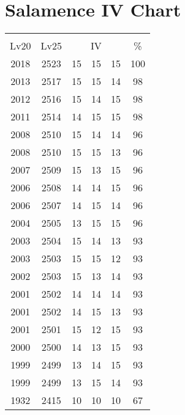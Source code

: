 \documentclass{article}%
\begin{document}
%
\normalsize%
\section{Salamence IV Chart}%
\label{sec:Salamence IV Chart}%
\renewcommand{\arraystretch}{1.5}%
\begin{tabular}{|c|c|c|c|c|c|}%
\hline%
\multicolumn{6}{|c|}{\textcolor{white}{ 
\linebreak{Salamence}
}%
\cellcolor{black}}\\%
\multicolumn{1}{|c}{Lv20}&\multicolumn{1}{c|}{Lv25}&\multicolumn{3}{c|}{IV}&\multicolumn{1}{|c|}{\%}\\%
\hline%
\rowcolor{color100}%
2018&2523&15&15&15&100\\%
\hline%
\rowcolor{color98}%
2013&2517&15&15&14&98\\%
\hline%
\rowcolor{color98}%
2012&2516&15&14&15&98\\%
\hline%
\rowcolor{color98}%
2011&2514&14&15&15&98\\%
\hline%
\rowcolor{color96}%
2008&2510&15&14&14&96\\%
\hline%
\rowcolor{color96}%
2008&2510&15&15&13&96\\%
\hline%
\rowcolor{color96}%
2007&2509&15&13&15&96\\%
\hline%
\rowcolor{color96}%
2006&2508&14&14&15&96\\%
\hline%
\rowcolor{color96}%
2006&2507&14&15&14&96\\%
\hline%
\rowcolor{color96}%
2004&2505&13&15&15&96\\%
\hline%
\rowcolor{color93}%
2003&2504&15&14&13&93\\%
\hline%
\rowcolor{color93}%
2003&2503&15&15&12&93\\%
\hline%
\rowcolor{color93}%
2002&2503&15&13&14&93\\%
\hline%
\rowcolor{color93}%
2001&2502&14&14&14&93\\%
\hline%
\rowcolor{color93}%
2001&2502&14&15&13&93\\%
\hline%
\rowcolor{color93}%
2001&2501&15&12&15&93\\%
\hline%
\rowcolor{color93}%
2000&2500&14&13&15&93\\%
\hline%
\rowcolor{color93}%
1999&2499&13&14&15&93\\%
\hline%
\rowcolor{color93}%
1999&2499&13&15&14&93\\%
\hline%
\rowcolor{color91}%
1932&2415&10&10&10&67\\%
\end{tabular}

%
\end{document}
